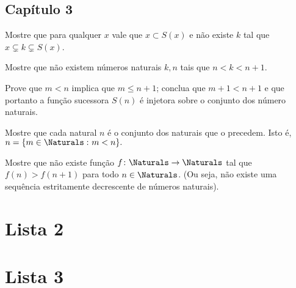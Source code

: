 \documentclass[a4paper]{article}
\begin{document}
\subsection{Capítulo 3}
\setcounter{theorem}{0}

\begin{exercicio}
Mostre que para qualquer \(x\) vale que \(x\subset S(x)\) e não existe \(k\) tal
que \(x\subsetneq k \subsetneq S(x)\).
\end{exercicio}
\begin{exercicio}
Mostre que não existem números naturais \(k,n\) tais que \(n < k < n+1\).
\end{exercicio}
\begin{exercicio}
 Prove que \(m < n\) implica que \(m\leq n+1\); conclua que \(m+1 < n+1\) e que
portanto a função sucessora \(S(n)\) é injetora sobre o conjunto dos número naturais.
\end{exercicio}
\begin{exercicio}
  Mostre que cada natural \(n\) é o conjunto dos naturais que o precedem. Isto
  é, \(n=\{m\in\Naturals\,\colon m< n\}.\)
\end{exercicio}
\begin{exercicio}
Mostre que não existe função \(f\colon\Naturals\to\Naturals\) tal que
\(f(n)>f(n+1)\) para todo \(n\in\Naturals\). (Ou seja, não existe uma sequência
estritamente decrescente de números naturais).  
\end{exercicio}
\section{Lista 2}
\begin{exercicio}

\end{exercicio}

\section{Lista 3}
\end{document}
